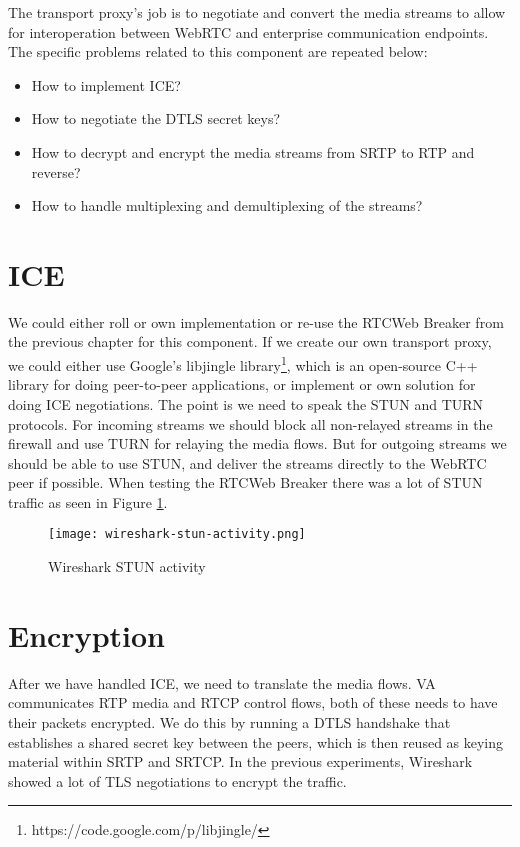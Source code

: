 The transport proxy's job is to negotiate and convert the media streams to allow for interoperation between WebRTC and enterprise communication endpoints. The specific problems related to this component are repeated below:

\begin{itemize}
\item{How to implement ICE?}
\item{How to negotiate the DTLS secret keys?}
\item{How to decrypt and encrypt the media streams from SRTP to RTP and reverse?}
\item{How to handle multiplexing and demultiplexing of the streams?}
\end{itemize}


\section{ICE}
We could either roll or own implementation or re-use the RTCWeb Breaker from the previous chapter for this component. If we create our own transport proxy, we could either use Google's libjingle library\footnote{https://code.google.com/p/libjingle/}, which is an open-source C++ library for doing peer-to-peer applications, or implement or own solution for doing ICE negotiations. The point is we need to speak the STUN and TURN protocols. For incoming streams we should block all non-relayed streams in the firewall and use TURN for relaying the media flows. But for outgoing streams we should be able to use STUN, and deliver the streams directly to the WebRTC peer if possible. When testing the RTCWeb Breaker there was a lot of STUN traffic as seen in Figure \ref{fig:wireshark-stun-activity}.

\begin{figure}[here]
\centerline{\texttt{[image: wireshark-stun-activity.png]}}
\caption{Wireshark STUN activity}
\label{fig:wireshark-stun-activity}
\end{figure}

\section{Encryption}
After we have handled ICE, we need to translate the media flows. VA communicates RTP media and RTCP control flows, both of these needs to have their packets encrypted. We do this by running a DTLS handshake that establishes a shared secret key between the peers, which is then reused as keying material within SRTP and SRTCP. In the previous experiments, Wireshark showed a lot of TLS negotiations to encrypt the traffic.

